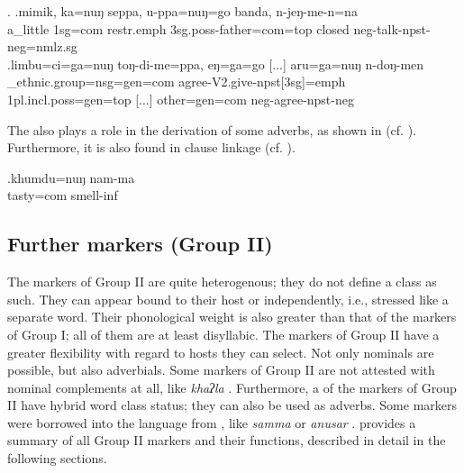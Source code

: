 		\ex. \ag.mimik,   ka=nuŋ    seppa,         u-ppa=nuŋ=go                   banda, n-jeŋ-me-n=na\\
		a\_little {\sc 1sg=com} {\sc restr.emph} {\sc 3sg.poss-}father{\sc =com=top} closed {\sc neg-}talk{\sc [3sg]-npst-neg=nmlz.sg}\\
		 
 	\bg.limbu=ci=ga=nuŋ                  toŋ-di-me=ppa,                     eŋ=ga=go [...] aru=ga=nuŋ        n-doŋ-men\\
			\_ethnic.group{\sc =nsg=gen=com}  agree{\sc -V2.give-npst[3sg]=emph} {\sc 1pl.incl.poss=gen=top} [...] other{\sc =gen=com} {\sc neg-}agree{\sc [3sg]-npst-neg}\\
		 
	

		
The  also plays a role in the derivation of some adverbs, as shown in \Next (cf.  ). Furthermore, it is also found in clause linkage (cf.  ).


\exg.khumdu=nuŋ nam-ma\\
			tasty{\sc =com} smell{\sc -inf}\\


\subsection{Further  markers (Group II)}\label{postpos}
  
The markers of Group II are quite heterogenous; they do not define a class as such. They can appear bound to their host or independently, i.e., stressed like a separate word. Their phonological weight is also greater than that of the markers of Group I; all of them are at least disyllabic.  The  markers of Group II  have a greater flexibility with regard to hosts they can select. Not only nominals are possible, but also adverbials. Some markers of Group II  are not attested with nominal complements at all, like \emph{khaʔla} .  Furthermore, a  of the markers of Group II have hybrid word class status; they can also be used as adverbs. Some markers were borrowed into the language from , like \emph{samma}  or \emph{anusar} .   provides a summary of all Group II markers and their functions, described in detail in the following sections.
 
